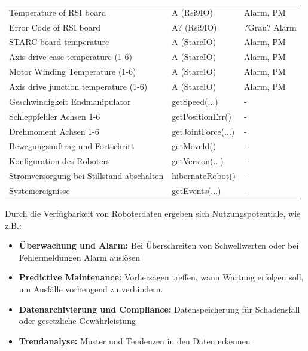 \documentclass[ a4paper,
                oneside,
                toc=bibliography,
                toc=listof
                ]{scrbook}
\begin{document}
\begin{longtable}{|p{7cm}|p{3cm}|p{3cm}|}
		Temperature of RSI board & A (Rsi9IO) & Alarm, PM \\
		Error Code of RSI board & A? (Rsi9IO) & ?Grau? Alarm \\
		\hline
		STARC board temperature & A (StarcIO) & Alarm, PM \\
		Axis drive case temperature (1-6) & A (StarcIO) & Alarm, PM \\
		Motor Winding Temperature (1-6) & A (StarcIO) & Alarm, PM \\
		Axis drive junction temperature (1-6) & A (StarcIO) & Alarm, PM \\		
		\hline
		Geschwindigkeit Endmanipulator & getSpeed(...) & - \\
		Schleppfehler Achsen 1-6 & getPositionErr()  & - \\
		Drehmoment Achsen 1-6 & getJointForce(...)  & - \\
		Bewegungsauftrag und Fortschritt & getMoveld()  & - \\
		Konfiguration des Roboters & getVersion(...)  & - \\
		Stromversorgung bei Stillstand abschalten & hibernateRobot()  & - \\
		Systemereignisse &getEvents(...)  & - \\
			
	\end{longtable}
	Durch die Verfügbarkeit von Roboterdaten ergeben sich Nutzungspotentiale, wie z.B.:
	\begin{itemize}
		\item \textbf{Überwachung und Alarm:} Bei Überschreiten von Schwellwerten oder bei Fehlermeldungen Alarm auslösen
		\item \textbf{Predictive Maintenance:} Vorhersagen treffen, wann Wartung erfolgen soll, um Ausfälle vorbeugend zu verhindern.
		\item \textbf{Datenarchivierung und Compliance:} Datenspeicherung für Schadensfall oder gesetzliche Gewährleistung
		\item \textbf{Trendanalyse:} Muster und Tendenzen in den Daten erkennen
	\end{itemize}
	
\end{document}
